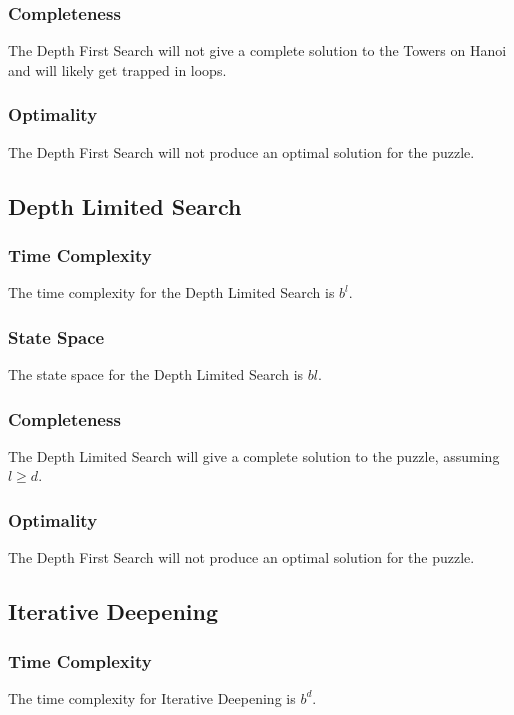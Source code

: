 \documentclass[10pt,letterpaper]{article}
\begin{document}
      \subsubsection{Completeness}
	The Depth First Search will not give a complete solution to the Towers on Hanoi and will likely get trapped in loops.
	
      \subsubsection{Optimality}
	The Depth First Search will not produce an optimal solution for the puzzle.
    
    \subsection{Depth Limited Search}
      \subsubsection{Time Complexity}
	The time complexity for the Depth Limited Search is \(b^l\).
    
      \subsubsection{State Space}
	The state space for the Depth Limited Search is \(bl\).
      
      \subsubsection{Completeness}
	The Depth Limited Search will give a complete solution to the puzzle, assuming \(l \geq d\).
	
      \subsubsection{Optimality}
	The Depth First Search will not produce an optimal solution for the puzzle.
    
    \subsection{Iterative Deepening}
      \subsubsection{Time Complexity}
	The time complexity for Iterative Deepening is \(b^d\).
    
\end{document}
